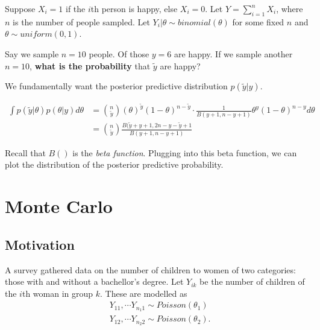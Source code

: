 \documentclass[titlepage, 12pt, leqno]{article}
\begin{document}
\begin{ex}
    Suppose $X_{i} = 1$ if the $i$th person is happy, else $X_{i}=0$. Let
    $Y = \sum_{i=1}^{n}X_{i}$, where $n$ is the number of people sampled. Let
    $Y_{i}|\theta \sim  binomial(\theta)$ for some fixed $n$ and 
    $\theta \sim  uniform(0,1)$.

    Say we sample $n=10$ people. Of those $y=6$ are happy. If we sample another
    $n=10$, \textbf{what is the probability} that $\tilde y$ are happy? 
    \vspace{10px}
    
    We fundamentally want the posterior predictive distribution $p(\tilde y |y)$.

    \begin{align*}
        \int p(\tilde y|\theta)p(\theta|y)d \theta &= 
        \binom{n}{\tilde y}(\theta)^{\tilde y}(1-\theta)^{n-\tilde y} \cdot
        \frac{1}{B(y+1, n-y+1)}\theta^{y}(1-\theta)^{n-y}d \theta \\
                                                   &= \binom{n}{\tilde y}
                                                   \frac{B(\tilde y + y + 1,
                                                   2n - y - \tilde y + 1}{
                                                   B(y+1, n-y+1)}
    \end{align*}
    
    Recall that $B()$ is the \textit{beta function}. Plugging into this beta
    function, we can plot the distribution of the posterior predictive 
    probability.
\end{ex}

\pagebreak
\section{Monte Carlo}
\subsection{Motivation}

A survey gathered data on the number of children to women of two categories:
those with and without a bachellor's degree. Let $Y_{ik}$ be the number of 
children of the $i$th woman in group $k$. These are modelled as
\begin{align*}
    &Y_{11}, \cdots Y_{n_{1}1} \sim Poisson(\theta_{1}) \\
    &Y_{12}, \cdots Y_{n_{2}2} \sim Poisson(\theta_{2}).
\end{align*}
\end{document}
